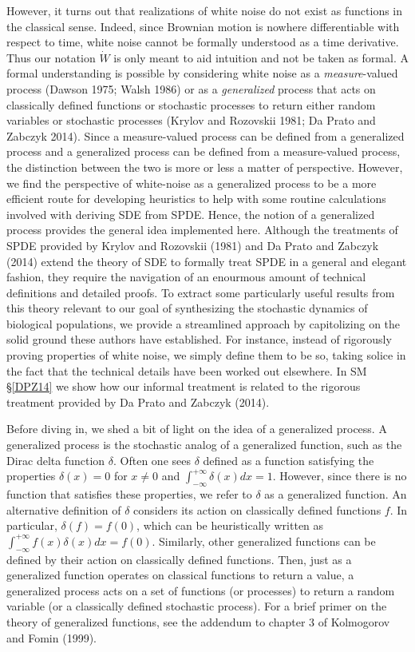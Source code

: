 \documentclass[]{article}
\begin{document}
However, it turns out that realizations of white noise do not exist as
functions in the classical sense. Indeed, since Brownian motion is
nowhere differentiable with respect to time, white noise cannot be
formally understood as a time derivative. Thus our notation \(\dot W\)
is only meant to aid intuition and not be taken as formal. A formal
understanding is possible by considering white noise as a
\emph{measure}-valued process (Dawson 1975; Walsh 1986) or as a
\emph{generalized} process that acts on classically defined functions or
stochastic processes to return either random variables or stochastic
processes (Krylov and Rozovskii 1981; Da Prato and Zabczyk 2014). Since
a measure-valued process can be defined from a generalized process and a
generalized process can be defined from a measure-valued process, the
distinction between the two is more or less a matter of perspective.
However, we find the perspective of white-noise as a generalized process
to be a more efficient route for developing heuristics to help with some
routine calculations involved with deriving SDE from SPDE. Hence, the
notion of a generalized process provides the general idea implemented
here. Although the treatments of SPDE provided by Krylov and Rozovskii
(1981) and Da Prato and Zabczyk (2014) extend the theory of SDE to
formally treat SPDE in a general and elegant fashion, they require the
navigation of an enourmous amount of technical definitions and detailed
proofs. To extract some particularly useful results from this theory
relevant to our goal of synthesizing the stochastic dynamics of
biological populations, we provide a streamlined approach by
capitolizing on the solid ground these authors have established. For
instance, instead of rigorously proving properties of white noise, we
simply define them to be so, taking solice in the fact that the
technical details have been worked out elsewhere. In SM \S\ref{DPZ14} we
show how our informal treatment is related to the rigorous treatment
provided by Da Prato and Zabczyk (2014).

Before diving in, we shed a bit of light on the idea of a generalized
process. A generalized process is the stochastic analog of a generalized
function, such as the Dirac delta function \(\delta\). Often one sees
\(\delta\) defined as a function satisfying the properties
\(\delta(x)=0\) for \(x\neq0\) and
\(\int_{-\infty}^{+\infty}\delta(x)dx=1\). However, since there is no
function that satisfies these properties, we refer to \(\delta\) as a
generalized function. An alternative definition of \(\delta\) considers
its action on classically defined functions \(f\). In particular,
\(\delta(f)=f(0)\), which can be heuristically written as
\(\int_{-\infty}^{+\infty}f(x)\delta(x)dx=f(0)\). Similarly, other
generalized functions can be defined by their action on classically
defined functions. Then, just as a generalized function operates on
classical functions to return a value, a generalized process acts on a
set of functions (or processes) to return a random variable (or a
classically defined stochastic process). For a brief primer on the
theory of generalized functions, see the addendum to chapter 3 of
Kolmogorov and Fomin (1999).
\end{document}
